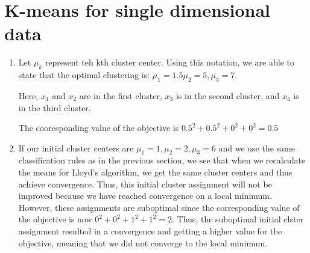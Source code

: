 \documentclass[11pt]{article}
\newcommand{\solution}[1]{{{\color{blue}{\bf Solution:} {#1}}}}
\begin{document}
\section{K-means for single dimensional data}
\begin{enumerate}
\item
\solution{
Let $\mu_k$ represent teh kth cluster center. Using this notation, we are able to state that the optimal clustering is: $\mu_1 = 1.5 \mu_2 = 5, \mu_3 = 7$.

Here, $x_1$ and $x_2$ are in the first cluster, $x_3$ is in the second cluster, and $x_4$ is in the third cluster.

The cooresponding value of the objective is $0.5^2 + 0.5^2 + 0^2 + 0^2 = 0.5$
}

\item
\solution{
If our initial cluster centers are $\mu_1 = 1, \mu_2 = 2, \mu_3 = 6$ and we use the same classification rules as in the previous section, we see that when we recalculate the means for Lloyd's algorithm, we get the same cluster centers and thus achieve convergence. Thus, this initial cluster assignment will not be improved because we have reached convergence on a local minimum. However, these assignments are suboptimal since the corresponding value of the objective is now $0^2 + 0^2 + 1^2 + 1^2 = 2$. Thus, the suboptimal initial clster assignment resulted in a convergence and getting a higher value for the objective, meaning that we did not converge to the local minimum.
}
\end{enumerate}
\end{document}
